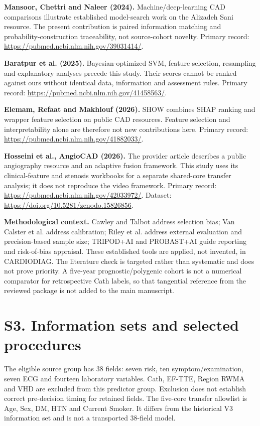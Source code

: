 \documentclass[10pt]{article}
\let\originalsection\section
\renewcommand\section{\Needspace{6\baselineskip}\originalsection}
\begin{document}
\textbf{Mansoor, Chettri and Naleer (2024).} Machine/deep-learning CAD comparisons illustrate established model-search work on the Alizadeh Sani resource. The present contribution is paired information matching and probability-construction traceability, not source-cohort novelty. Primary record: \url{https://pubmed.ncbi.nlm.nih.gov/39031414/}.

\textbf{Baratpur et al. (2025).} Bayesian-optimized SVM, feature selection, resampling and explanatory analyses precede this study. Their scores cannot be ranked against ours without identical data, information and assessment rules. Primary record: \url{https://pubmed.ncbi.nlm.nih.gov/41458563/}.

\textbf{Elemam, Refaat and Makhlouf (2026).} SHOW combines SHAP ranking and wrapper feature selection on public CAD resources. Feature selection and interpretability alone are therefore not new contributions here. Primary record: \url{https://pubmed.ncbi.nlm.nih.gov/41882033/}.

\textbf{Hosseini et al., AngioCAD (2026).} The provider article describes a public angiography resource and an adaptive fusion framework. This study uses its clinical-feature and stenosis workbooks for a separate shared-core transfer analysis; it does not reproduce the video framework. Primary record: \url{https://pubmed.ncbi.nlm.nih.gov/42033972/}. Dataset: \url{https://doi.org/10.5281/zenodo.15826856}.

\textbf{Methodological context.} Cawley and Talbot address selection bias; Van Calster et al. address calibration; Riley et al. address external evaluation and precision-based sample size; TRIPOD+AI and PROBAST+AI guide reporting and risk-of-bias appraisal. These established tools are applied, not invented, in CARDIODIAG. The literature check is targeted rather than systematic and does not prove priority. A five-year prognostic/polygenic cohort is not a numerical comparator for retrospective Cath labels, so that tangential reference from the reviewed package is not added to the main manuscript.

\section*{S3. Information sets and selected procedures}
The eligible source group has 38 fields: seven risk, ten symptom/examination, seven ECG and fourteen laboratory variables. Cath, EF-TTE, Region RWMA and VHD are excluded from this predictor group. Exclusion does not establish correct pre-decision timing for retained fields. The five-core transfer allowlist is Age, Sex, DM, HTN and Current Smoker. It differs from the historical V3 information set and is not a transported 38-field model.
\end{document}

